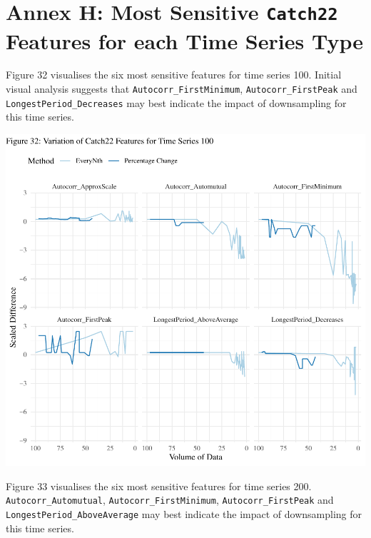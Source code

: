 \documentclass{article}
\begin{document}
\newpage

\hypertarget{annex-h-most-sensitive-catch22-features-for-each-time-series-type}{%
\section{\texorpdfstring{Annex H: Most Sensitive \texttt{Catch22}
Features for each Time Series
Type}{Annex H: Most Sensitive Catch22 Features for each Time Series Type}}\label{annex-h-most-sensitive-catch22-features-for-each-time-series-type}}

Figure 32 visualises the six most sensitive features for time series
100. Initial visual analysis suggests that
\texttt{Autocorr\_FirstMinimum}, \texttt{Autocorr\_FirstPeak} and
\texttt{LongestPeriod\_Decreases} may best indicate the impact of
downsampling for this time series.

\includegraphics{210431461_CSC8639_Dissertation_files/figure-latex/Catch22Variation100-1.pdf}

\newpage

Figure 33 visualises the six most sensitive features for time series
200. \texttt{Autocorr\_Automutual}, \texttt{Autocorr\_FirstMinimum},
\texttt{Autocorr\_FirstPeak} and \texttt{LongestPeriod\_AboveAverage}
may best indicate the impact of downsampling for this time series.
\end{document}
